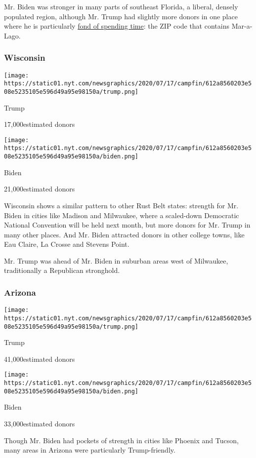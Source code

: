Mr. Biden was stronger in many parts of southeast Florida, a liberal,
densely populated region, although Mr. Trump had slightly more donors in
one place where he is particularly
\href{https://www.nytimes.com/interactive/2017/04/05/us/politics/tracking-trumps-visits-to-his-branded-properties.html}{fond
of spending time}: the ZIP code that contains Mar-a-Lago.

\hypertarget{wisconsin}{%
\subsubsection{Wisconsin}\label{wisconsin}}

\texttt{[image: https://static01.nyt.com/newsgraphics/2020/07/17/campfin/612a8560203e508e5235105e596d49a95e98150a/trump.png]}

Trump

17,000estimated donors

\texttt{[image: https://static01.nyt.com/newsgraphics/2020/07/17/campfin/612a8560203e508e5235105e596d49a95e98150a/biden.png]}

Biden

21,000estimated donors

Wisconsin shows a similar pattern to other Rust Belt states: strength
for Mr. Biden in cities like Madison and Milwaukee, where a scaled-down
Democratic National Convention will be held next month, but more donors
for Mr. Trump in many other places. And Mr. Biden attracted donors in
other college towns, like Eau Claire, La Crosse and Stevens Point.

Mr. Trump was ahead of Mr. Biden in suburban areas west of Milwaukee,
traditionally a Republican stronghold.

\hypertarget{arizona}{%
\subsubsection{Arizona}\label{arizona}}

\texttt{[image: https://static01.nyt.com/newsgraphics/2020/07/17/campfin/612a8560203e508e5235105e596d49a95e98150a/trump.png]}

Trump

41,000estimated donors

\texttt{[image: https://static01.nyt.com/newsgraphics/2020/07/17/campfin/612a8560203e508e5235105e596d49a95e98150a/biden.png]}

Biden

33,000estimated donors

Though Mr. Biden had pockets of strength in cities like Phoenix and
Tucson, many areas in Arizona were particularly Trump-friendly.

